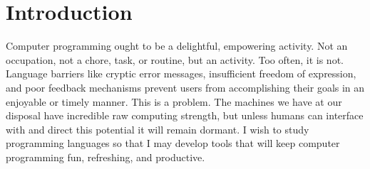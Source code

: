 \documentclass{article}
\begin{document}
\newcommand{\phd}{Ph.D.}
\newcommand{\university}{%
\texttt{<your-college-here>}
}


\newcommand{\sloc}{7.7 million lines}
\newcommand{\numprojects}{43}





\section{Introduction}
Computer programming ought to be a delightful, empowering activity. 
Not an occupation, not a chore, task, or routine, but an activity.
Too often, it is not. 
Language barriers like cryptic error messages, insufficient freedom of expression, and poor feedback mechanisms prevent users from accomplishing their goals in an enjoyable or timely manner.
This is a problem.
The machines we have at our disposal have incredible raw computing strength, but unless humans can interface with and direct this potential it will remain dormant. 
I wish to study programming languages so that I may develop tools that will keep computer programming fun, refreshing, and productive.
\end{document}

